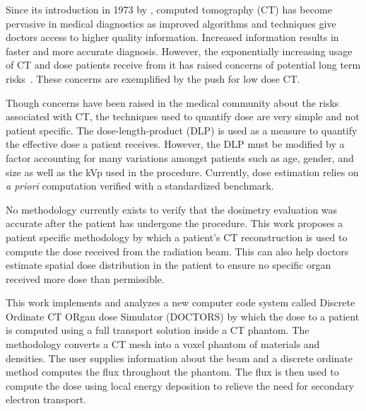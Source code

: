 

Since its introduction in 1973 by \citet{ref:hounsfieldg}, computed tomography (CT) has become pervasive in medical diagnostics as improved algorithms and techniques give doctors access to higher quality information. Increased information results in faster and more accurate diagnosis. However, the exponentially increasing usage of CT and dose patients receive from it has raised concerns of potential long term risks~\citep{ref:brennerd,ref:einsteina1,ref:abramsh,ref:einsteina2,ref:mccolloughc,ref:yul}. These concerns are exemplified by the push for low dose CT.


Though concerns have been raised in the medical community about the risks associated with CT, the techniques used to quantify dose are very simple and not patient specific. The dose-length-product (DLP) is used as a measure to quantify the effective dose a patient receives. However, the DLP must be modified by a factor accounting for many variations amongst patients such as age, gender, and size as well as the kVp used in the procedure. Currently, dose estimation relies on \textit{a priori} computation verified with a standardized benchmark. 

No methodology currently exists to verify that the dosimetry evaluation was accurate after the patient has undergone the procedure. This work proposes a patient specific methodology by which a patient's CT reconstruction is used to compute the dose received from the radiation beam. This can also help doctors estimate spatial dose distribution in the patient to ensure no specific organ received more dose than permissible.

This work implements and analyzes a new computer code system called Discrete Ordinate CT ORgan dose Simulator (DOCTORS) by which the dose to a patient is computed using a full transport solution inside a CT phantom. The methodology converts a CT mesh into a voxel phantom of materials and densities. The user supplies information about the beam and a discrete ordinate method computes the flux throughout the phantom. The flux is then used to compute the dose using local energy deposition to relieve the need for secondary electron transport.

